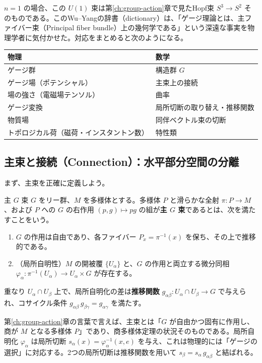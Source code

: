 \documentclass[uplatex, dvipdfmx, book]{jsbook}
\let\origsubsection\subsection
\let\origsubsubsection\subsubsection
\renewcommand{\section}{\origsubsection}
\renewcommand{\subsection}{\origsubsubsection}
\renewcommand{\subsubsection}{\paragraph}
\begin{document}
$n = 1$ の場合、この $U(1)$ 束は第\ref{ch:group-action}章で見たHopf束 $S^3 \to S^2$ そのものである。このWu--Yangの辞書（dictionary）は、「ゲージ理論とは、主ファイバー束（Principal fiber bundle）上の幾何学である」という深遠な事実を物理学者に気付かせた。対応をまとめると次のようになる。

\begin{center}
\begin{tabular}{ll}
    \hline
    物理 & 数学 \\
    \hline
    ゲージ群 & 構造群 $G$ \\
    ゲージ場（ポテンシャル） & 主束上の接続 \\
    場の強さ（電磁場テンソル） & 曲率 \\
    ゲージ変換 & 局所切断の取り替え・推移関数 \\
    物質場 & 同伴ベクトル束の切断 \\
    トポロジカル荷（磁荷・インスタントン数） & 特性類 \\
    \hline
\end{tabular}
\end{center}

\section{主束と接続（Connection）：水平部分空間の分離}

まず、主束を正確に定義しよう。

\begin{mydef}{主 $G$ 束}{}
$G$ をリー群、$M$ を多様体とする。多様体 $P$ と滑らかな全射 $\pi: P \to M$、および $P$ への $G$ の右作用 $(p, g) \mapsto p g$ の組が\textbf{主 $G$ 束}であるとは、次を満たすことをいう。
\begin{enumerate}
    \item $G$ の作用は自由であり、各ファイバー $P_x = \pi^{-1}(x)$ を保ち、その上で推移的である。
    \item （局所自明性）$M$ の開被覆 $\{U_\alpha\}$ と、$G$ の作用と両立する微分同相 $\varphi_\alpha: \pi^{-1}(U_\alpha) \to U_\alpha \times G$ が存在する。
\end{enumerate}
重なり $U_\alpha \cap U_\beta$ 上で、局所自明化の差は\textbf{推移関数} $g_{\alpha\beta}: U_\alpha \cap U_\beta \to G$ で与えられ、コサイクル条件 $g_{\alpha\beta}\, g_{\beta\gamma} = g_{\alpha\gamma}$ を満たす。
\end{mydef}

第\ref{ch:group-action}章の言葉で言えば、主束とは「$G$ が自由かつ固有に作用し、商が $M$ となる多様体 $P$」であり、商多様体定理の状況そのものである。局所自明化 $\varphi_\alpha$ は局所切断 $s_\alpha(x) = \varphi_\alpha^{-1}(x, e)$ を与え、これは物理的には「ゲージの選択」に対応する。2つの局所切断は推移関数を用いて $s_\beta = s_\alpha\, g_{\alpha\beta}$ と結ばれる。
\end{document}
